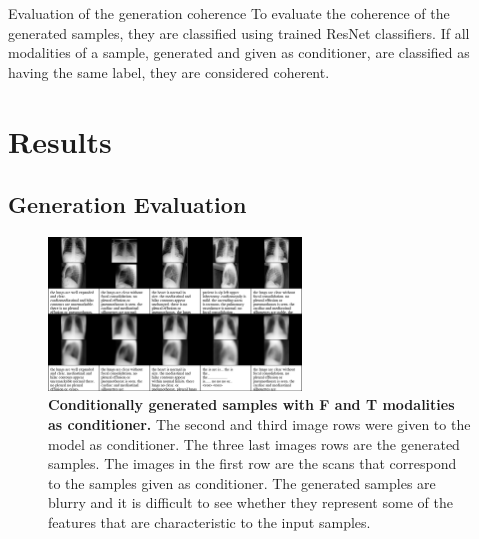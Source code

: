     \begin{frame}{}
        \begin{figure}[!h]
            \centering
        \end{figure}    
    \end{frame}

    \begin{frame}{Evaluation of the generation coherence}
        To evaluate the coherence of the generated samples, they are classified using trained ResNet classifiers.
        If all modalities of a sample, generated and given as conditioner, are classified as having the same label, they are considered coherent.
    \end{frame}


    \section{Results}

    \subsection{Generation Evaluation}
    \begin{frame}
        \begin{figure}
            \centering
            \includegraphics[width=0.6\textwidth, height = \textheight, keepaspectratio]{data/cond_gen/Lateral_text}
                \caption{\tiny{
        \textbf{Conditionally generated samples with F and T modalities as conditioner.} The second and third image rows were given to the model as conditioner. The three last images rows are the generated samples. The images in the first row are the scans that correspond to the samples given as conditioner. The generated samples are blurry and it is difficult to see whether they represent some of the features that are characteristic to the input samples.
    }}
        \end{figure}
    \end{frame}



    \printbibliography

